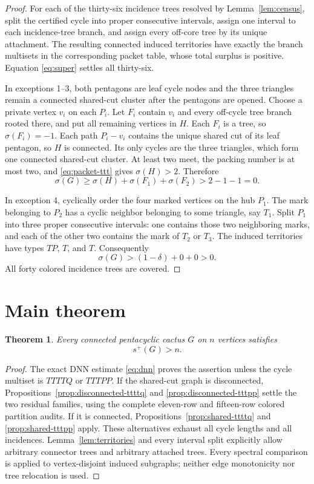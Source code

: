 \documentclass[11pt]{article}
\newtheorem{theorem}{Theorem}[section]
\newcommand{\spE}{s^+}
\newcommand{\sig}{\sigma}
\begin{document}
\begin{proof}
For each of the thirty-six incidence trees resolved by
Lemma~\ref{lem:census}, split the certified cycle into proper consecutive
intervals, assign one interval to each incidence-tree branch, and assign every
off-core tree by its unique attachment.  The resulting connected induced
territories have exactly the branch multisets in the corresponding packet
table, whose total surplus is positive.  Equation \eqref{eq:super} settles all
thirty-six.

In exceptions 1--3, both pentagons are leaf cycle nodes and the three
triangles remain a connected shared-cut cluster after the pentagons are
opened.  Choose a private vertex $v_i$ on each $P_i$.  Let $F_i$ contain
$v_i$ and every off-cycle tree branch rooted there, and put all remaining
vertices in $H$.  Each $F_i$ is a tree, so $\sig(F_i)=-1$.  Each path
$P_i-v_i$ contains the unique shared cut of its leaf pentagon, so $H$ is
connected.  Its only cycles are the three triangles, which form one connected
shared-cut cluster.  At least two meet, the packing number is at most two, and
\eqref{eq:packet-ttt} gives $\sig(H)>2$.  Therefore
\[
 \sig(G)\geq\sig(H)+\sig(F_1)+\sig(F_2)>2-1-1=0.
\]

In exception 4, cyclically order the four marked vertices on the hub $P_1$.
The mark belonging to $P_2$ has a cyclic neighbor belonging to some triangle,
say $T_1$.  Split $P_1$ into three proper consecutive intervals: one contains
those two neighboring marks, and each of the other two contains the mark of
$T_2$ or $T_3$.  The induced territories have types $TP$, $T$, and $T$.
Consequently
\[
 \sig(G)>(1-\delta)+0+0>0.
\]
All forty colored incidence trees are covered.
\end{proof}

\section{Main theorem}

\begin{theorem}\label{thm:main}
Every connected pentacyclic cactus $G$ on $n$ vertices satisfies
\[
 \boxed{\spE(G)>n}.
\]
\end{theorem}

\begin{proof}
The exact DNN estimate \eqref{eq:dnn} proves the assertion unless the cycle
multiset is $TTTTQ$ or $TTTPP$.  If the shared-cut graph is disconnected,
Propositions~\ref{prop:disconnected-ttttq} and
\ref{prop:disconnected-tttpp} settle the two residual families, using the
complete eleven-row and fifteen-row colored partition audits.  If it is
connected, Propositions~\ref{prop:shared-ttttq} and
\ref{prop:shared-tttpp} apply.  These alternatives exhaust all cycle lengths
and all incidences.  Lemma~\ref{lem:territories} and every interval split
explicitly allow arbitrary connector trees and arbitrary attached trees.
Every spectral comparison is applied to vertex-disjoint induced subgraphs;
neither edge monotonicity nor tree relocation is used.
\end{proof}
\end{document}
